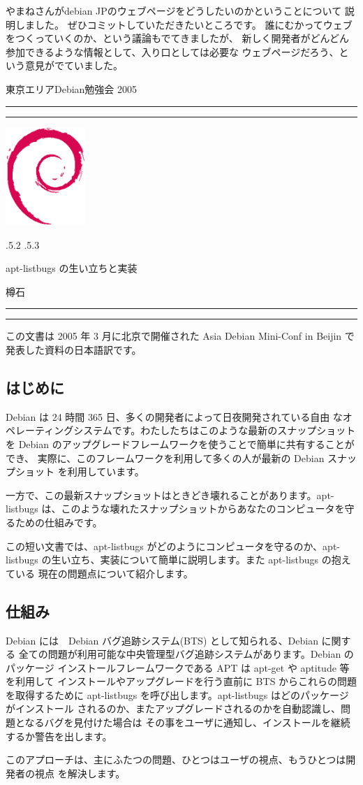 \documentclass[mingoth,a4paper]{jsarticle}
\makeatletter
\renewcommand{\section}{\@startsection{section}{1}{\z@}%
    {\Cvs \@plus.5\Cdp \@minus.2\Cdp}%
    {.5\Cvs \@plus.3\Cdp}%
    {\normalfont\Large\headfont\raggedright\centering}} %
\newcommand{\dancersection}[2]{%
\newpage
東京エリアDebian勉強会 2005
\hrule
\vspace{0.5mm}
\hrule
\hfill{}\includegraphics[width=3cm]{image200502/openlogo-nd.eps}\\
\vspace{-4cm}
\begin{center}
  \section{#1}
\end{center}
\hfill{}#2\hspace{3cm}\space\\
\hrule
\hrule
\vspace{1cm}
}
\makeatother
\begin{document}
	    やまねさんがdebian JPのウェブページをどうしたいのかということについて
	    説明しました。
	    ぜひコミットしていただきたいところです。
	    誰にむかってウェブをつくっていくのか、という議論もでてきましたが、
	    新しく開発者がどんどん参加できるような情報として、入り口としては必要な
	    ウェブページだろう、という意見がでていました。



\dancersection{apt-listbugs の生い立ちと実装}{樽石}
\label{sec:taruishi}
この文書は 2005 年 3 月に北京で開催された Asia Debian Mini-Conf
in Beijin で発表した資料の日本語訳です。

\subsection{はじめに}


Debian は 24 時間 365 日、多くの開発者によって日夜開発されている自由
なオペレーティングシステムです。わたしたちはこのような最新のスナップショットを
Debian のアップグレードフレームワークを使うことで簡単に共有することができ、
実際に、このフレームワークを利用して多くの人が最新の Debian スナップショット
を利用しています。

一方で、この最新スナップショットはときどき壊れることがあります。apt-listbugs
は、このような壊れたスナップショットからあなたのコンピュータを守るための仕組みです。

この短い文書では、apt-listbugs がどのようにコンピュータを守るのか、apt-listbugs
の生い立ち、実装について簡単に説明します。また apt-listbugs の抱えている
現在の問題点について紹介します。

\subsection{仕組み}

Debian には　Debian バグ追跡システム(BTS) として知られる、Debian に関する
全ての問題が利用可能な中央管理型バグ追跡システムがあります。Debian のパッケージ
インストールフレームワークである APT は apt-get や aptitude 等を利用して
インストールやアップグレードを行う直前に BTS からこれらの問題を取得するために
apt-listbugs を呼び出します。apt-listbugs はどのパッケージがインストール
されるのか、またアップグレードされるのかを自動認識し、問題となるバグを見付けた場合は
その事をユーザに通知し、インストールを継続するか警告を出します。

このアプローチは、主にふたつの問題、ひとつはユーザの視点、もうひとつは開発者の視点
を解決します。
\end{document}
